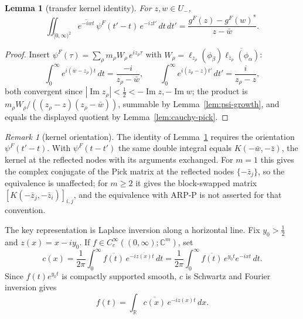 \documentclass[11pt]{amsart}
\newtheorem{lemma}[theorem]{Lemma}
\theoremstyle{definition}
\theoremstyle{remark}
\newtheorem{remark}[theorem]{Remark}
\theoremstyle{definition}
\renewcommand{\Im}{\operatorname{Im}}
\newcommand{\half}{\tfrac{1}{2}}
\newcommand{\R}{\mathbb{R}}
\newcommand{\C}{\mathbb{C}}
\begin{document}
\begin{lemma}[transfer kernel identity]\label{lem:transfer-kernel}
For $z,w\in U_-$,
\[
   \iint_{[0,\infty)^2}\overline{e^{-iwt}}\,\psi^F(t'-t)\,e^{-izt'}\,dt\,dt'
   =\frac{g^F(z)-g^F(w)^*}{z-\bar w}.
\]
\end{lemma}
\begin{proof}
Insert $\psi^F(\tau)=\sum_\rho m_\rho W_\rho\,e^{iz_\rho\tau}$ with
$W_\rho=\ell_{z_\rho}(\phi_\beta)\overline{\ell_{\bar z_\rho}(\phi_\alpha)}$:
\[
   \int_0^\infty e^{i(\bar w-z_\rho)t}\,dt=\frac{-i}{z_\rho-\bar w},
   \qquad
   \int_0^\infty e^{i(z_\rho-z)t'}\,dt'=\frac{i}{z_\rho-z},
\]
both convergent since $|\Im z_\rho|<\half<-\Im z,-\Im w$; the product is
$m_\rho W_\rho/((z_\rho-z)(z_\rho-\bar w))$, summable by Lemma~\ref{lem:psi-growth}, and equals the
displayed quotient by Lemma~\ref{lem:cauchy-pick}.
\end{proof}

\begin{remark}[kernel orientation]\label{rmk:kernel-orientation}
The identity of Lemma~\ref{lem:transfer-kernel} requires the orientation $\psi^F(t'-t)$.  With
$\psi^F(t-t')$ the same double integral equals $K(-\bar w,-\bar z)$, the kernel at the reflected nodes
with its arguments exchanged.  For $m=1$ this gives the complex conjugate of the Pick matrix at the
reflected nodes $\{-\bar z_j\}$, so the equivalence is unaffected; for $m\ge2$ it gives the
block-swapped matrix $[K(-\bar z_j,-\bar z_i)]_{i,j}$, and the equivalence with ARP-P is not asserted
for that convention.
\end{remark}

The key representation is Laplace inversion along a horizontal line.  Fix $y_0>\half$ and
$z(x)=x-iy_0$.  If $f\in C_c^\infty((0,\infty);\C^m)$, set
\[
   c(x)=\frac1{2\pi}\int_0^\infty \overline{f(t)}\,e^{-i\overline{z(x)}t}\,dt
        =\frac1{2\pi}\int_0^\infty \overline{f(t)}\,e^{y_0t}e^{-ixt}\,dt.
\]
Since $f(t)e^{y_0t}$ is compactly supported smooth, $c$ is Schwartz and Fourier inversion gives
\[
   f(t)=\int_\R \overline{c(x)}\,e^{-iz(x)t}\,dx .
\]
\end{document}
